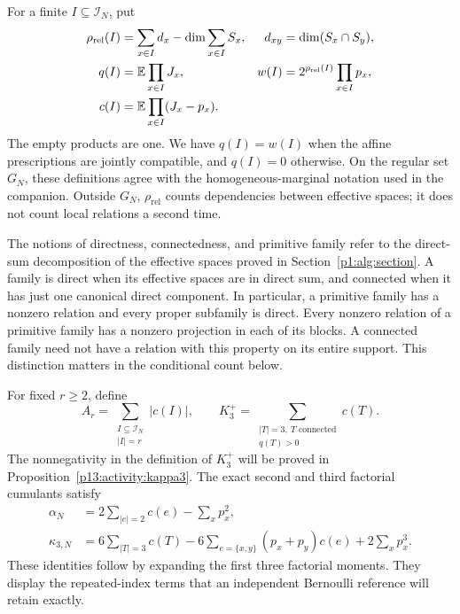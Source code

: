 For a finite \(I\subseteq\mathcal I_N\), put
\begin{align}
 \rho_{\mathrm{rel}}(I)
  &=\sum_{x\in I}d_x-\dim\sum_{x\in I}S_x,
       & d_{xy}&=\dim(S_x\cap S_y),\label{p13:exact:rank}\\
 q(I)&=\mathbb E\prod_{x\in I}J_x,
       & w(I)&=2^{\rho_{\mathrm{rel}}(I)}
                         \prod_{x\in I}p_x,\label{p13:exact:weights}\\
 c(I)&=\mathbb E\prod_{x\in I}(J_x-p_x).
 \label{p13:exact:center}
\end{align}
The empty products are one. We have \(q(I)=w(I)\) when the
affine prescriptions are jointly compatible, and \(q(I)=0\)
otherwise. On the regular set \(G_N\), these definitions agree
with the homogeneous-marginal notation used in the companion.
Outside \(G_N\), \(\rho_{\mathrm{rel}}\) counts dependencies
between effective spaces; it does not count local relations a
second time.

The notions of directness, connectedness, and primitive family
refer to the direct-sum decomposition of the effective spaces
proved in Section~\ref{p1:alg:section}. A family is direct when its
effective spaces are in direct sum, and connected when it has just one
canonical direct component. In particular, a primitive
family has a nonzero relation and every proper subfamily is
direct. Every nonzero relation of a primitive family has a
nonzero projection in each of its blocks. A connected family
need not have a relation with this property on its entire
support. This distinction matters in the conditional count below.

For fixed \(r\ge2\), define
\begin{equation}
 A_r=\sum_{\substack{I\subseteq\mathcal I_N\\|I|=r}}|c(I)|,
 \qquad
 K_3^+=\sum_{\substack{|T|=3,\ T\text{ connected}\\q(T)>0}}c(T).
 \label{p13:exact:activities}
\end{equation}
The nonnegativity in the definition of \(K_3^+\) will be proved
in Proposition~\ref{p13:activity:kappa3}.
The exact second and third factorial cumulants satisfy
\begin{align}
 \alpha_N&=2\sum_{|e|=2}c(e)-\sum_xp_x^2,
 \label{p13:exact:alpha}\\
 \kappa_{3,N}
   &=6\sum_{|T|=3}c(T)
       -6\sum_{e=\{x,y\}}(p_x+p_y)c(e)
       +2\sum_xp_x^3.
 \label{p13:exact:kappa3}
\end{align}
These identities follow by expanding the first three factorial
moments. They display the repeated-index terms that an
independent Bernoulli reference will retain exactly.

